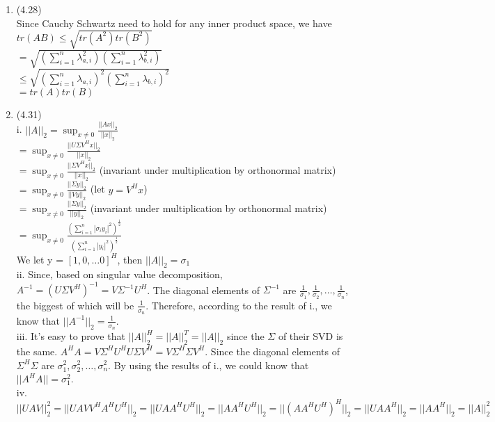 \documentclass[letterpaper,12pt]{article}
\theoremstyle{definition}
\begin{document}
\begin{enumerate}
	\item(4.28)\\
	Since Cauchy Schwartz need to hold for any inner product space, we have $tr(AB) \leq \sqrt{tr(A^2)tr(B^2)}$\\
	$ = \sqrt{(\sum_{i = 1}^{n}\lambda_{a, i}^{2})(\sum_{i = 1}^{n}\lambda_{b, i}^{2})}$\\
	$\leq  \sqrt{(\sum_{i = 1}^{n}\lambda_{a, i})^{2}(\sum_{i = 1}^{n}\lambda_{b, i})^{2}}$\\
	$= tr(A)tr(B)$

	\item(4.31)\\
	i. $||A||_{2} = \sup_{x \neq 0} \frac{||Ax||_{2}}{||x||_{2}}$\\
	   $=  \sup_{x \neq 0} \frac{||U\Sigma V^{H}x||_{2}}{||x||_{2}}$\\
	   $= \sup_{x \neq 0} \frac{||\Sigma V^{H}x||_{2}}{||x||_{2}}$ (invariant under multiplication by orthonormal matrix)\\
	   $= \sup_{x \neq 0} \frac{||\Sigma y||_{2}}{||Vy||_{2}}$ (let $y  = V^{H}x$)\\
	   $= \sup_{x \neq 0} \frac{||\Sigma y||_{2}}{||y||_{2}}$  (invariant under multiplication by orthonormal matrix)\\
	   $= \sup_{x \neq 0} \frac{(\sum_{i = 1}^{n} |\sigma_{i}y_{i}|^{2})^{\frac{1}{2}}}{(\sum_{i = 1}^{n} |y_{i}|^{2})^{\frac{1}{2}}}$\\
	   We let y =  $[1, 0, \hdots 0]^{H}$, then $||A||_{2} = \sigma_{1}$\\
	ii. Since, based on singular value decomposition, $A^{-1} = (U\Sigma V^{H})^{-1} = V \Sigma^{-1} U^{H}$. The diagonal elements of $\Sigma^{-1}$ are $\frac{1}{\sigma_{1}}, \frac{1}{\sigma_{2}}, \hdots, \frac{1}{\sigma_{n}}$, the biggest of which will be $\frac{1}{\sigma_{n}}$. Therefore, according to the result of i., we know that $||A^{-1}||_{2} = \frac{1}{\sigma_{n}}$.\\
	iii. It's easy to prove that $||A||_{2}^{H} = ||A||_{2}^{T} = ||A||_{2}$ since the $\Sigma$ of their SVD is the same. $A^{H}A = V\Sigma^{H}U^{H}U\Sigma V^{H} = V \Sigma^{H}\Sigma V^{H}$. Since the diagonal elements of $ \Sigma^{H}\Sigma$ are $\sigma_{1}^{2}, \sigma_{2}^{2}, \hdots, \sigma_{n}^{2}$. By using the results of i., we could know that $||A^{H}A|| = \sigma_{1}^{2}$.\\
	iv. $||UAV||_{2}^{2} = ||UAVV^{H}A^{H}U^{H}||_{2} = ||UAA^{H}U^{H}||_{2} = ||AA^{H}U^{H}||_{2} = ||(AA^{H}U^{H})^{H}||_{2} = ||UAA^{H}||_{2} = ||AA^{H}||_{2} = ||A||_{2}^{2}$\\


\end{enumerate}
\end{document}
